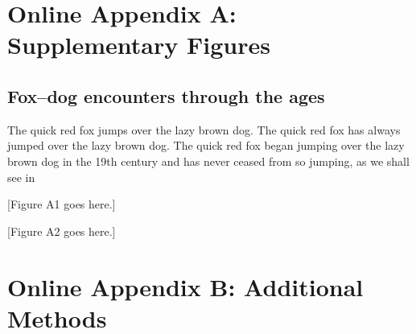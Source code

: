 \documentclass[11pt]{article}
\begin{document}


\newpage{}

\renewcommand{\thesection}{\Alph{section}}

\section*{Online Appendix A: Supplementary Figures}


\renewcommand{\theequation}{A\arabic{equation}}
\renewcommand{\thetable}{A\arabic{table}}
\setcounter{equation}{0}  %
\setcounter{figure}{0}
\setcounter{table}{0}

\subsection*{Fox--dog encounters through the ages}

The quick red fox jumps over the lazy brown dog. The quick red fox has 
always jumped over the lazy brown dog. The quick red fox began jumping 
over the lazy brown dog in the 19th century and has never ceased from so 
jumping, as we shall see in 

[Figure A1 goes here.]

[Figure A2 goes here.]

\newpage{}

\section*{Online Appendix B: Additional Methods}

\renewcommand{\theequation}{B\arabic{equation}}
\setcounter{equation}{0}  %
\renewcommand{\thetable}{B\arabic{table}}
\setcounter{figure}{0}
\setcounter{table}{0}
\end{document}
